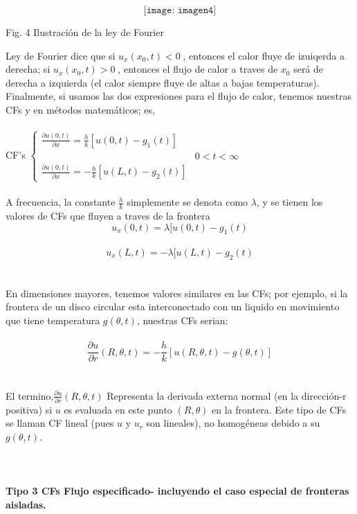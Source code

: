\documentclass[10pt,a4paper]{report}
\begin{document}
\newpage
$$\texttt{[image: imagen4]}$$ 
\begin{center}
\small {Fig. 4 Ilustración de la ley de Fourier}
\end{center} 
Ley de Fourier dice que si
$u_x(x_0,t)<0 \;$, entonces el calor fluye de izuiqerda a derecha; si $u_x(x_0,t)>0 \;$, entonces el flujo de calor a traves de $x_0$ será de derecha a izquierda (el calor siempre fluye de altas a bajas temperaturas).
\\ Finalmente, si usamos las dos expresiones para el flujo de calor, tenemos nuestras CFs y en métodos matemáticos; es,
\\\\ CF's $
\left \{ \begin{matrix}
\displaystyle \frac{\partial u (0,t)}{\partial x} = \frac{h}{k}[u(0,t)-g_1(t)]
\\
& 0<t<\infty
\\
\displaystyle \frac{\partial u (0,t)}{\partial x} = -\frac{h}{k}[u(L,t)-g_2(t)] 
\end{matrix} \right. $ 
\\\\ A frecuencia, la constante $\frac{h}{k}$ simplemente se denota como $\lambda$, y se tienen los valores de CFs que fluyen a traves de la frontera
\\ $$\displaystyle u_x(0,t) = \lambda [u(0,t)-g_1(t)$$
\ $$\displaystyle u_x(L,t) = -\lambda [u(L,t)-g_2(t)$$
\\\\ En dimensiones mayores, tenemos valores similares en las CFs; por ejemplo, si la frontera de un disco circular esta interconectado con un liquido en movimiento que tiene temperatura $g(\theta,t)$, nuestras CFs serian:
\\\\ $$\displaystyle \frac{\partial u}{\partial r}(R, \theta, t)= - \frac{h}{k}[u(R, \theta, t)-g(\theta ,t)]$$
\\\\ El termino,$\displaystyle \frac{\partial u}{\partial r}(R, \theta, t)$ Representa la derivada externa normal (en la dirección-r positiva) si $u$ es evaluada en este punto $(R, \theta)$ en la frontera. Este tipo de CFs se llaman CF lineal (pues $u$ y $u_r$ son lineales), no homogéneas debido a su $g(\theta,t)$.
\\\\
\\\\ \textbf {Tipo 3 CFs Flujo especificado- incluyendo el caso especial de fronteras aisladas.}
\end{document}
